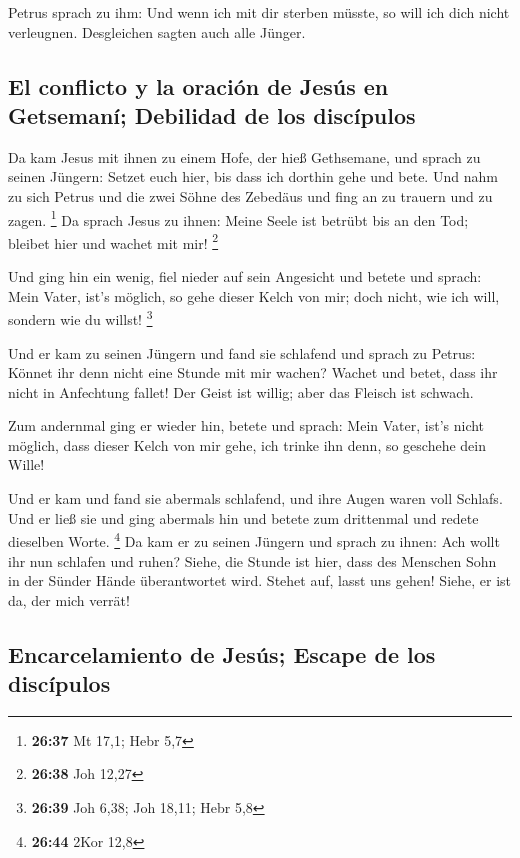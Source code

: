  Petrus sprach zu ihm: Und wenn ich mit dir sterben
müsste, so will ich dich nicht verleugnen. Desgleichen sagten auch alle
Jünger.

\hypertarget{el-conflicto-y-la-oraciuxf3n-de-jesuxfas-en-getsemanuxed-debilidad-de-los-discuxedpulos}{%
\subsection{El conflicto y la oración de Jesús en Getsemaní; Debilidad
de los
discípulos}\label{el-conflicto-y-la-oraciuxf3n-de-jesuxfas-en-getsemanuxed-debilidad-de-los-discuxedpulos}}

 Da kam Jesus mit ihnen zu einem Hofe, der hieß
Gethsemane, und sprach zu seinen Jüngern: Setzet euch hier, bis dass ich
dorthin gehe und bete.  Und nahm zu sich Petrus und die
zwei Söhne des Zebedäus und fing an zu trauern und zu zagen. \footnote{\textbf{26:37}
  Mt 17,1; Hebr 5,7}  Da sprach Jesus zu ihnen: Meine
Seele ist betrübt bis an den Tod; bleibet hier und wachet mit mir!
\footnote{\textbf{26:38} Joh 12,27}

 Und ging hin ein wenig, fiel nieder auf sein Angesicht
und betete und sprach: Mein Vater, ist's möglich, so gehe dieser Kelch
von mir; doch nicht, wie ich will, sondern wie du willst! \footnote{\textbf{26:39}
  Joh 6,38; Joh 18,11; Hebr 5,8}

 Und er kam zu seinen Jüngern und fand sie schlafend und
sprach zu Petrus: Könnet ihr denn nicht eine Stunde mit mir wachen?
 Wachet und betet, dass ihr nicht in Anfechtung fallet!
Der Geist ist willig; aber das Fleisch ist schwach.

 Zum andernmal ging er wieder hin, betete und sprach:
Mein Vater, ist's nicht möglich, dass dieser Kelch von mir gehe, ich
trinke ihn denn, so geschehe dein Wille!

 Und er kam und fand sie abermals schlafend, und ihre
Augen waren voll Schlafs.  Und er ließ sie und ging
abermals hin und betete zum drittenmal und redete dieselben Worte.
\footnote{\textbf{26:44} 2Kor 12,8}  Da kam er zu seinen
Jüngern und sprach zu ihnen: Ach wollt ihr nun schlafen und ruhen?
Siehe, die Stunde ist hier, dass des Menschen Sohn in der Sünder Hände
überantwortet wird.  Stehet auf, lasst uns gehen! Siehe,
er ist da, der mich verrät!

\hypertarget{encarcelamiento-de-jesuxfas-escape-de-los-discuxedpulos}{%
\subsection{Encarcelamiento de Jesús; Escape de los
discípulos}\label{encarcelamiento-de-jesuxfas-escape-de-los-discuxedpulos}}

